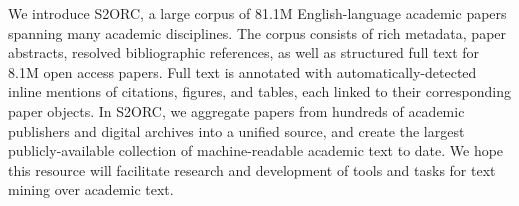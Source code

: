 We introduce S2ORC, a large corpus of 81.1M English-language academic papers spanning many academic disciplines.  The corpus consists of rich metadata, paper abstracts, resolved bibliographic references, as well as structured full text for 8.1M open access papers. Full text is annotated with automatically-detected inline mentions of citations, figures, and tables, each linked to their corresponding paper objects. In S2ORC, we aggregate papers from hundreds of academic publishers and digital archives into a unified source, and create the largest publicly-available collection of machine-readable academic text to date. We hope this resource will facilitate research and development of tools and tasks for text mining over academic text.
